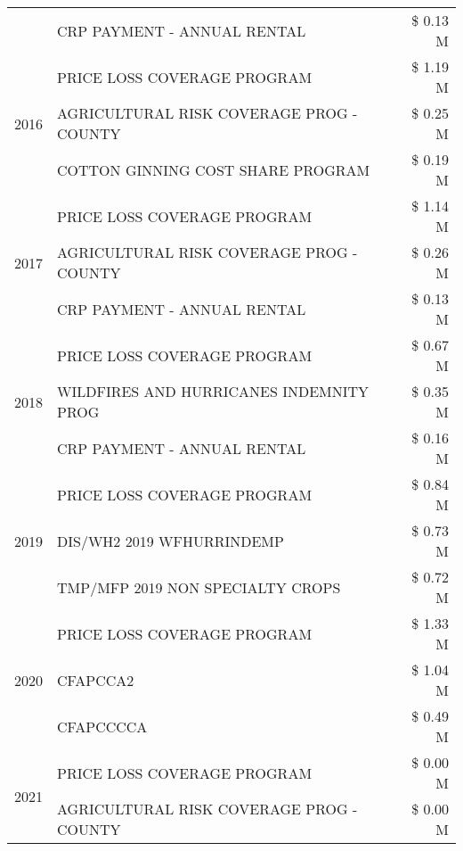 \begin{tabular}{llr}
 & CRP PAYMENT - ANNUAL RENTAL & \$ 0.13 M \\
\cline{1-3}
\multirow[t]{3}{*}{2016} & PRICE LOSS COVERAGE PROGRAM                   & \$ 1.19 M \\
 & AGRICULTURAL RISK COVERAGE PROG - COUNTY      & \$ 0.25 M \\
 & COTTON GINNING COST SHARE PROGRAM             & \$ 0.19 M \\
\cline{1-3}
\multirow[t]{3}{*}{2017} & PRICE LOSS COVERAGE PROGRAM & \$ 1.14 M \\
 & AGRICULTURAL RISK COVERAGE PROG - COUNTY & \$ 0.26 M \\
 & CRP PAYMENT - ANNUAL RENTAL & \$ 0.13 M \\
\cline{1-3}
\multirow[t]{3}{*}{2018} & PRICE LOSS COVERAGE PROGRAM & \$ 0.67 M \\
 & WILDFIRES AND HURRICANES INDEMNITY PROG & \$ 0.35 M \\
 & CRP PAYMENT - ANNUAL RENTAL & \$ 0.16 M \\
\cline{1-3}
\multirow[t]{3}{*}{2019} & PRICE LOSS COVERAGE PROGRAM & \$ 0.84 M \\
 & DIS/WH2 2019 WFHURRINDEMP & \$ 0.73 M \\
 & TMP/MFP 2019 NON SPECIALTY CROPS & \$ 0.72 M \\
\cline{1-3}
\multirow[t]{3}{*}{2020} & PRICE LOSS COVERAGE PROGRAM & \$ 1.33 M \\
 & CFAPCCA2 & \$ 1.04 M \\
 & CFAPCCCCA & \$ 0.49 M \\
\cline{1-3}
\multirow[t]{2}{*}{2021} & PRICE LOSS COVERAGE PROGRAM & \$ 0.00 M \\
 & AGRICULTURAL RISK COVERAGE PROG - COUNTY & \$ 0.00 M \\
\cline{1-3}
\bottomrule
\end{tabular}
